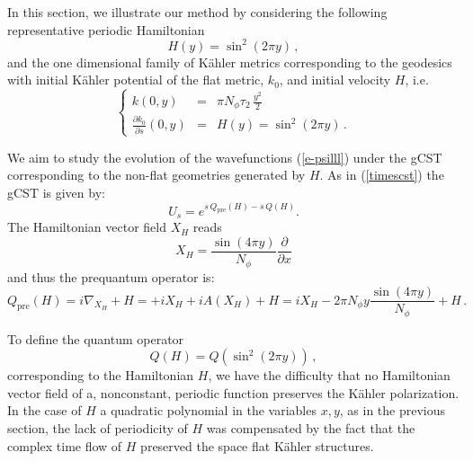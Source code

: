 \documentclass[a4paper,11pt]{article}
\begin{document}


In this section, we illustrate our method by considering the following representative  periodic Hamiltonian
\begin{equation}
    H(y) = \sin^2{(2\pi y)} \, ,
\end{equation}
and the one dimensional family of K\"ahler metrics corresponding to the geodesics with initial  K\"ahler potential of the flat metric, $k_0$, and initial velocity $H$,
i.e.
\begin{equation}
\label{e-IC}
    \left\{
    \begin{array}{rcl}
       k(0,y)  & =  & \pi N_\phi \tau_2 \, \frac{y^2}{2}\\
        \frac{\partial k_0}{\partial s}(0,y)  & = &  H(y) = \sin^2{(2\pi y)} \, . 
    \end{array}
    \right.
\end{equation}


We aim to study the evolution of the wavefunctions (\ref{e-psilll}) under the gCST corresponding to the non-flat geometries 
generated by $H$. As in (\ref{timescst}) the gCST  is given by: \begin{equation} 
U_{s} = e^{s \, Q_{\mathrm{pre}}(H) - s \, Q(H)}. 
\end{equation} 
 The  Hamiltonian vector field $X_{H}$ reads
 $$
 X_{H} = \frac{\sin(4\pi y)}{N_{\phi}}\frac{\partial}{\partial x}
 $$
  and thus the prequantum operator  is:
\begin{equation}
   Q_{\mathrm{pre}}(H) = i\nabla_{X_{H}} + H =  +iX_{H} + iA(X_{H}) + H = iX_{H}- 2\pi N_{\phi}y\frac{\sin(4\pi y)}{N_{\phi}} + H \, . 
\end{equation}

To define the quantum operator 
$$
Q(H)= Q(\sin^2(2\pi y)) \, ,
$$
corresponding to the Hamiltonian $H$, 
we have the difficulty that no Hamiltonian vector field of a, nonconstant,
periodic function preserves the K\"ahler
polarization. In the case of $H$ a quadratic
polynomial in the variables $x, y$, as in the previous section,
the lack of periodicity of $H$ was compensated
by the fact that the complex time flow 
of $H$ preserved the space flat K\"ahler structures.
\end{document}
